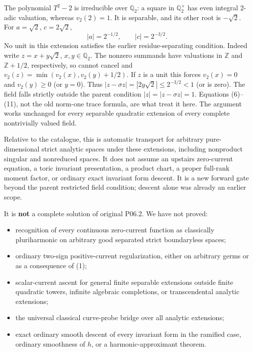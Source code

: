\documentclass[
  11pt,
]{article}
\providecommand{\tightlist}{%
  \setlength{\itemsep}{0pt}\setlength{\parskip}{0pt}}
\begin{document}
The polynomial \(T^2-2\) is irreducible over \(\mathbb Q_2\): a square
in \(\mathbb Q_2^\times\) has even integral \(2\)-adic valuation,
whereas \(v_2(2)=1\). It is separable, and its other root is
\(-\sqrt2\). For \(a=\sqrt2\), \(c=2\sqrt2\), \[
 |a|=2^{-1/2},\qquad |c|=2^{-3/2}.
\] No unit in this extension satisfies the earlier residue-separating
condition. Indeed write \(z=x+y\sqrt2\), \(x,y\in\mathbb Q_2\). The
nonzero summands have valuations in \(\mathbb Z\) and \(\mathbb Z+1/2\),
respectively, so cannot cancel and \(v_2(z)=\min(v_2(x),v_2(y)+1/2)\).
If \(z\) is a unit this forces \(v_2(x)=0\) and \(v_2(y)\geq0\) (or
\(y=0\)). Thus \(|z-\sigma z|=|2y\sqrt2|\leq2^{-3/2}<1\) (or is zero).
The field falls strictly outside the parent condition
\(|z|=|z-\sigma z|=1\). Equations (6)--(11), not the old norm-one trace
formula, are what treat it here. The argument works unchanged for every
separable quadratic extension of every complete nontrivially valued
field.

Relative to the catalogue, this is automatic transport for arbitrary
pure-dimensional strict analytic spaces under these extensions,
including nonproduct singular and nonreduced spaces. It does not assume
an upstairs zero-current equation, a toric invariant presentation, a
product chart, a proper full-rank moment factor, or ordinary exact
invariant form descent. It is a new forward gate beyond the parent
restricted field condition; descent alone was already an earlier scope.

It is \textbf{not} a complete solution of original P06.2. We have not
proved:

\begin{itemize}
\tightlist
\item
  recognition of every continuous zero-current function as classically
  pluriharmonic on arbitrary good separated strict boundaryless spaces;
\item
  ordinary two-sign positive-current regularization, either on arbitrary
  germs or as a consequence of (1);
\item
  scalar-current ascent for general finite separable extensions outside
  finite quadratic towers, infinite algebraic completions, or
  transcendental analytic extensions;
\item
  the universal classical curve-probe bridge over all analytic
  extensions;
\item
  exact ordinary smooth descent of every invariant form in the ramified
  case, ordinary smoothness of \(h\), or a harmonic-approximant theorem.
\end{itemize}
\end{document}
